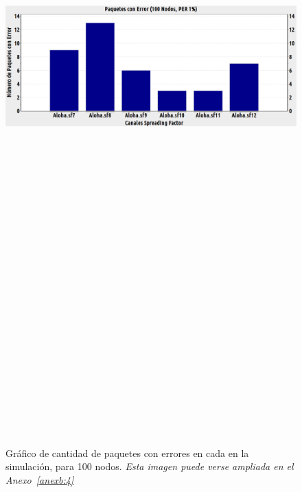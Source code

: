 \begin{justify}
\begin{figure}[!ht]
\includegraphics[width=13cm,height=30cm,keepaspectratio]{images/errores100nodos.eps}
\caption{Gráfico de cantidad de paquetes con errores en cada  en la simulación, para 100 nodos. \textit{Esta imagen puede verse ampliada en el Anexo~\ref{anexb:4}}}
\label{prueba:5}
\end{figure}
\end{justify}